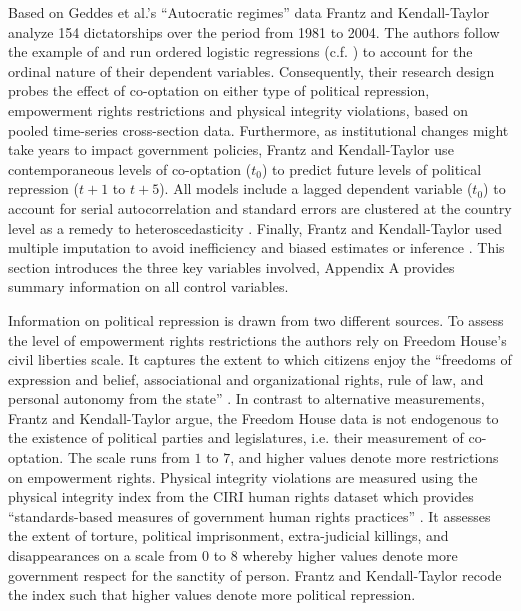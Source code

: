 Based on Geddes et al.'s \citeyearpar{Geddes.2014}
``Autocratic regimes'' data Frantz and Kendall-Taylor
analyze 154 dictatorships over the period from 1981 to 2004.
The authors follow the example of \citet{Vreeland.2008} and
run ordered logistic regressions
(c.f. \cite{Fox.2008,Fox.2011}) to account for the ordinal 
nature of their dependent variables. Consequently, their 
research design probes the effect of co-optation on either 
type of political repression, empowerment rights 
restrictions and physical integrity violations, based on 
pooled time-series cross-section data. Furthermore, as 
institutional changes might take years to impact government 
policies, Frantz and Kendall-Taylor use contemporaneous 
levels of co-optation ($t_0$) to predict future levels 
of political repression ($t+1$ to $t+5$). All models 
include a lagged dependent variable ($t_0$) to account for 
serial autocorrelation and standard errors are clustered at 
the country level as a remedy to heteroscedasticity 
\citep{Beck.1995}. Finally, Frantz and Kendall-Taylor used
multiple imputation to avoid inefficiency and biased 
estimates or inference 
\citep{King.2001b,Honaker.2010,Honaker.2011}. This section
introduces the three key variables involved, Appendix A 
provides summary information on all control variables.

Information on political repression is drawn from two 
different sources. To assess the level of empowerment 
rights restrictions the authors rely on Freedom House's 
civil liberties scale. It captures the extent to which 
citizens enjoy the ``freedoms of expression and belief, 
associational and organizational rights, rule of law, and 
personal autonomy from the state'' 
\citep{FreedomHouse.2010}. In contrast to alternative 
measurements, Frantz and Kendall-Taylor argue, the Freedom 
House data is not endogenous to the existence of political 
parties and legislatures, i.e. their measurement of 
co-optation. The scale runs from $1$ to $7$, and higher 
values denote more restrictions on empowerment rights. 
Physical integrity violations are measured using the 
physical integrity index from the CIRI human rights dataset 
which provides ``standards-based measures of government 
human rights practices'' \citep[402]{Cingranelli.2010b}. 
It assesses the extent of torture, political imprisonment, 
extra-judicial killings, and disappearances on a scale from
$0$ to $8$ whereby higher values denote more government respect 
for the sanctity of person. Frantz and 
Kendall-Taylor recode the index such that higher values 
denote more political repression.

